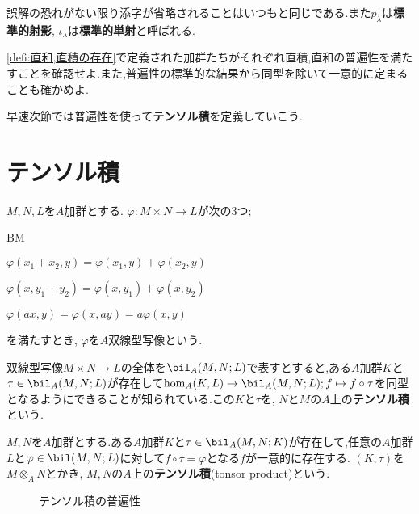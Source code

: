 誤解の恐れがない限り添字が省略されることはいつもと同じである.また$p_\lambda$は\textbf{標準的射影}, $\iota_\lambda$は\textbf{標準的単射}と呼ばれる.

\begin{exer}
\ref{defi:直和,直積の存在}で定義された加群たちがそれぞれ直積,直和の普遍性を満たすことを確認せよ.また,普遍性の標準的な結果から同型を除いて一意的に定まることも確かめよ.
\end{exer}

早速次節では普遍性を使って\textbf{テンソル積}を定義していこう.

\section{テンソル積}

\begin{defi}[双線型写像]
	$M,N,L$を$A$加群とする. $\varphi:M\times N\to L$が次の3つ;
	\begin{defiterm}{BM}
		\item $\varphi(x_1+x_2,y)=\varphi(x_1,y)+\varphi(x_2,y)$
		\item $\varphi(x,y_1+y_2)=\varphi(x,y_1)+\varphi(x,y_2)$
		\item $\varphi(ax,y)=\varphi(x,ay)=a\varphi(x,y)$
	\end{defiterm}
	を満たすとき, $\varphi$を$A$双線型写像という.
\end{defi}

双線型写像$M\times N\to L$の全体を$\bil_A(M,N;L)$で表すとすると,ある$A$加群$K$と$\tau\in\bil_A(M,N;L)$が存在して$\hom_A(K,L)\to\bil_A(M,N;L);f\mapsto f\circ\tau$を同型となるようにできることが知られている.この$K$と$\tau$を, $N$と$M$の$A$上の\textbf{テンソル積}という.

\begin{defi}[テンソル積]
	$M,N$を$A$加群とする.ある$A$加群$K$と$\tau\in\bil_A(M,N;K)$が存在して,任意の$A$加群$L$と$\varphi\in\bil(M,N;L)$に対して$f\circ\tau=\varphi$となる$f$が一意的に存在する. $(K,\tau)$を$M\otimes_A N$とかき, $M,N$の$A$上の\textbf{テンソル積}(tonsor product)という.
\end{defi}

\begin{figure}[H]
	\centering
	\caption{テンソル積の普遍性}\label{fig:tensor}
\end{figure}

